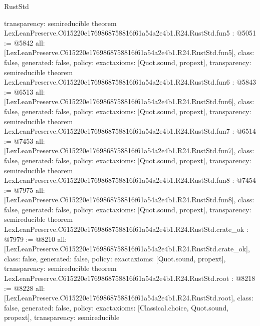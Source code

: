 \begin{lexlean}{RustStd}
\begin{coremodule}
{  transparency: semireducible
}
theorem LexLeanPreserve.C615220e1769868758816f61a54a2e4b1.R24.RustStd.fun5 : @5051 := @5842 {
  all: [LexLeanPreserve.C615220e1769868758816f61a54a2e4b1.R24.RustStd.fun5],
  class: false,
  generated: false,
  policy: exact{axioms: [Quot.sound, propext]},
  transparency: semireducible
}
theorem LexLeanPreserve.C615220e1769868758816f61a54a2e4b1.R24.RustStd.fun6 : @5843 := @6513 {
  all: [LexLeanPreserve.C615220e1769868758816f61a54a2e4b1.R24.RustStd.fun6],
  class: false,
  generated: false,
  policy: exact{axioms: [Quot.sound, propext]},
  transparency: semireducible
}
theorem LexLeanPreserve.C615220e1769868758816f61a54a2e4b1.R24.RustStd.fun7 : @6514 := @7453 {
  all: [LexLeanPreserve.C615220e1769868758816f61a54a2e4b1.R24.RustStd.fun7],
  class: false,
  generated: false,
  policy: exact{axioms: [Quot.sound, propext]},
  transparency: semireducible
}
theorem LexLeanPreserve.C615220e1769868758816f61a54a2e4b1.R24.RustStd.fun8 : @7454 := @7975 {
  all: [LexLeanPreserve.C615220e1769868758816f61a54a2e4b1.R24.RustStd.fun8],
  class: false,
  generated: false,
  policy: exact{axioms: [Quot.sound, propext]},
  transparency: semireducible
}
theorem LexLeanPreserve.C615220e1769868758816f61a54a2e4b1.R24.RustStd.crate_ok : @7979 := @8210 {
  all: [LexLeanPreserve.C615220e1769868758816f61a54a2e4b1.R24.RustStd.crate_ok],
  class: false,
  generated: false,
  policy: exact{axioms: [Quot.sound, propext]},
  transparency: semireducible
}
theorem LexLeanPreserve.C615220e1769868758816f61a54a2e4b1.R24.RustStd.root : @8218 := @8228 {
  all: [LexLeanPreserve.C615220e1769868758816f61a54a2e4b1.R24.RustStd.root],
  class: false,
  generated: false,
  policy: exact{axioms: [Classical.choice, Quot.sound, propext]},
  transparency: semireducible
}


\end{coremodule}
\end{lexlean}

